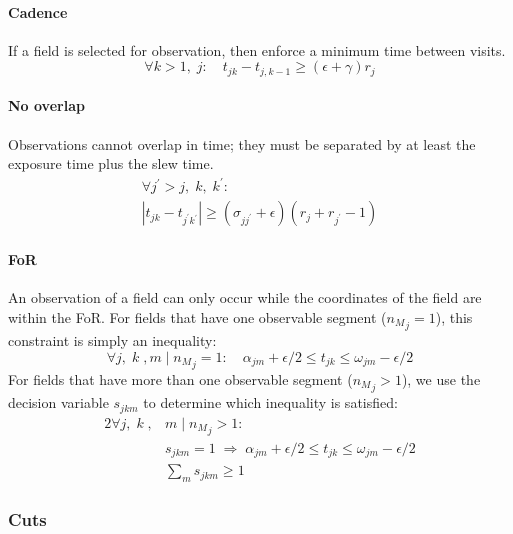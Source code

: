 \documentclass[twocolumn,times]{aastex631}
\begin{document}
\paragraph{Cadence}
If a field is selected for observation, then enforce a minimum time between visits.
%
\begin{equation}
    \label{eq:fixed-exptime-constraint-cadence}
    \forall k > 1 ,\; j :\quad t_{jk} - t_{j,k-1} \geq (\epsilon + \gamma) r_j
\end{equation}

\paragraph{No overlap}
Observations cannot overlap in time; they must be separated by at least the exposure time plus the slew time.
%
\begin{multline}
    \label{eq:fixed-exptime-constraint-no-overlap}
    \forall j^\prime > j,\; k ,\; k^\prime : \\ \left|t_{jk} - t_{j^\prime k^\prime}\right|  \geq \left(\sigma_{jj^\prime} + \epsilon\right) \left( r_j + r_{j^\prime} - 1\right)
\end{multline}

\paragraph{\ac{FoR}}
An observation of a field can only occur while the coordinates of the field are within the \ac{FoR}. For fields that have one observable segment (${n_M}_j = 1$), this constraint is simply an inequality:
%
\begin{equation}
    \label{eq:fixed-exptime-constraint-for-one}
    \forall j ,\; k \;, m \mid {n_M}_j = 1 :\quad \alpha_{jm} + \epsilon / 2 \leq t_{jk} \leq \omega_{jm} - \epsilon / 2
\end{equation}
%
For fields that have more than one observable segment (${n_M}_j > 1$), we use the decision variable $s_{jkm}$ to determine which inequality is satisfied:
%
\begin{alignat}{2}
    \label{eq:fixed-exptime-constraint-for-many}
    \forall j ,\; k \;, &m \mid {n_M}_j > 1 : \nonumber \\
    &s_{jkm} = 1 \;\Rightarrow\; \alpha_{jm} + \epsilon / 2 \leq t_{jk} \leq \omega_{jm} - \epsilon / 2 \\
    &\sum_m s_{jkm} \geq 1
\end{alignat}

\subsubsection{Cuts}
\end{document}
